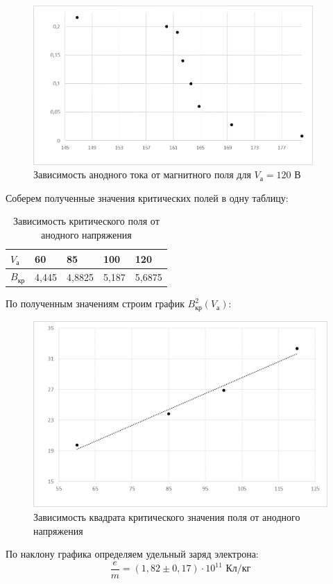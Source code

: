 \documentclass[a4paper, 12pt]{article}
\begin{document}
\begin {figure}[H]
\begin{center}
\includegraphics[width=0.95\textwidth]{graph6_gk}
\caption{Зависимость анодного тока от магнитного поля для $V_\text{а}=120$ В}
\end{center}
\end {figure}




\newpage
Соберем полученные значения критических полей в одну таблицу:

\begin{table}[H] 
\centering 
\begin{tabular}{|l|l|l|l|l|} 
\hline 
\textbf{$V_\text{а}$} & 60 & 85 & 100 & 120 \\ \hline 
\textbf{$B_\text{кр}$} & 4,445 & 4,8825 & 5,187 & 5,6875 \\ \hline 
\end{tabular} 
\caption{Зависимость критического поля от анодного напряжения} 
\label{my-label} 
\end{table}


По полученным значениям строим график $B_\text{кр}^2(V_\text{а})$:

\begin {figure}[H]
\begin{center}
\includegraphics[width=\textwidth]{graph7_gk}
\caption{Зависимость квадрата критического значения поля от анодного напряжения}
\end{center}
\end {figure}
По наклону графика определяем удельный заряд электрона:
$$\frac{e}{m} = (1,82 \pm 0,17) \cdot 10^{11} \text{ Кл/кг}$$
\end{document}
